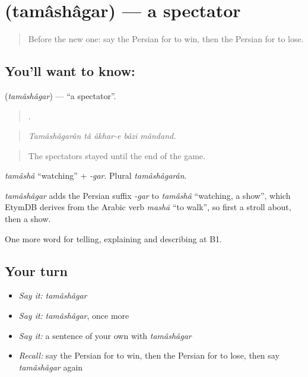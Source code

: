 \section[\texorpdfstring{\fa{تماشاگر} (tamâshâgar)}{تماشاگر (tamâshâgar)}]{ (tamâshâgar) — a spectator}

\label{lesson:FA-C343-tamashagar}



\begin{quote}
Before the new one: say the Persian for to win, then the Persian for to lose.
\end{quote}

\subsection*{You'll want to know: }
\textbf{} (\emph{tamâshâgar}) — \textquotedblleft{}a spectator\textquotedblright{}.

\begin{quote}
    .
\end{quote}

\begin{quote}
\emph{Tamâshâgarân tâ âkhar-e bâzi mândand.}
\end{quote}

\begin{quote}
The spectators stayed until the end of the game.
\end{quote}

\emph{tamâshâ} \textquotedblleft{}watching\textquotedblright{} + \emph{-gar}. Plural \emph{tamâshâgarân}.

\begin{cousinweb}
\emph{tamâshâgar} adds the Persian suffix \emph{-gar} to \emph{tamâshâ} \textquotedblleft{}watching, a show\textquotedblright{}, which EtymDB derives from the Arabic verb \emph{mashā} \textquotedblleft{}to walk\textquotedblright{}, so first a stroll about, then a show.
\end{cousinweb}

\begin{grammarlens}[title={What you've built}]
One more word for telling, explaining and describing at B1.
\end{grammarlens}

\subsection*{Your turn}
\begin{itemize}
\raggedright
  \item \emph{Say it:} \emph{tamâshâgar}
  \item \emph{Say it:} \emph{tamâshâgar}, once more
  \item \emph{Say it:} a sentence of your own with \emph{tamâshâgar}
  \item \emph{Recall:} say the Persian for to win, then the Persian for to lose, then say \emph{tamâshâgar} again
\end{itemize}

